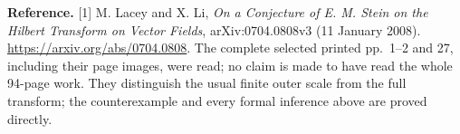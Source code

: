 \documentclass[10pt,a4paper]{article}
\begin{document}
\textbf{Reference.}
[1] M. Lacey and X. Li, \emph{On a Conjecture of E. M. Stein on the Hilbert
Transform on Vector Fields}, arXiv:0704.0808v3 (11 January 2008).
\url{https://arxiv.org/abs/0704.0808}.
The complete selected printed pp.~1--2 and 27, including their page images,
were read; no claim is made to have read the whole 94-page work.
They distinguish the usual finite outer scale from the full transform;
the counterexample and every formal inference above are proved directly.
\end{document}

